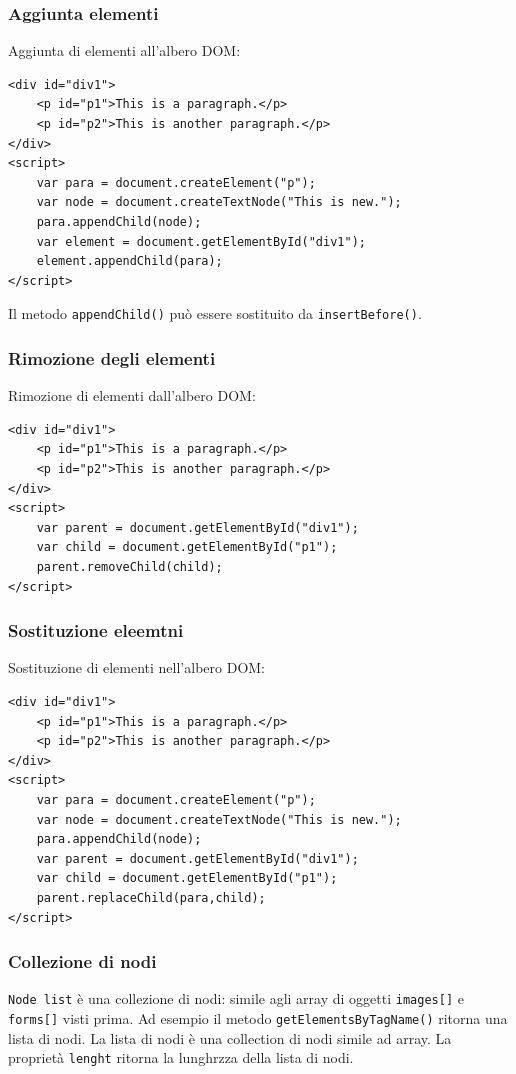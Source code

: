 \documentclass{article}
\begin{document}
\subsubsection{Aggiunta elementi}
Aggiunta di elementi all'albero DOM:
\begin{lstlisting}[style=htmlstyle]
<div id="div1">
    <p id="p1">This is a paragraph.</p>
    <p id="p2">This is another paragraph.</p>
</div>
<script>
    var para = document.createElement("p");
    var node = document.createTextNode("This is new.");
    para.appendChild(node);
    var element = document.getElementById("div1");
    element.appendChild(para);
</script>
\end{lstlisting}
Il metodo \texttt{appendChild()} può essere sostituito da \texttt{insertBefore()}.
\subsubsection{Rimozione degli elementi}
Rimozione di elementi dall'albero DOM:
\begin{lstlisting}[style=htmlstyle]
<div id="div1">
    <p id="p1">This is a paragraph.</p>
    <p id="p2">This is another paragraph.</p>
</div>
<script>
    var parent = document.getElementById("div1");
    var child = document.getElementById("p1");
    parent.removeChild(child);
</script>
\end{lstlisting}
\subsubsection{Sostituzione eleemtni}
Sostituzione di elementi nell'albero DOM:
\begin{lstlisting}[style=htmlstyle]
<div id="div1">
    <p id="p1">This is a paragraph.</p>
    <p id="p2">This is another paragraph.</p>
</div>
<script>
    var para = document.createElement("p");
    var node = document.createTextNode("This is new.");
    para.appendChild(node);
    var parent = document.getElementById("div1");
    var child = document.getElementById("p1");
    parent.replaceChild(para,child);
</script>
\end{lstlisting}
\subsubsection{Collezione di nodi}
\texttt{Node list} è una collezione di nodi: simile agli array di oggetti \texttt{images[]} e \texttt{forms[]} visti prima. Ad esempio
il metodo \texttt{getElementsByTagName()} ritorna una lista di nodi. La lista di nodi è una collection di nodi simile ad array. La proprietà
\texttt{lenght} ritorna la lunghrzza della lista di nodi.
\end{document}

